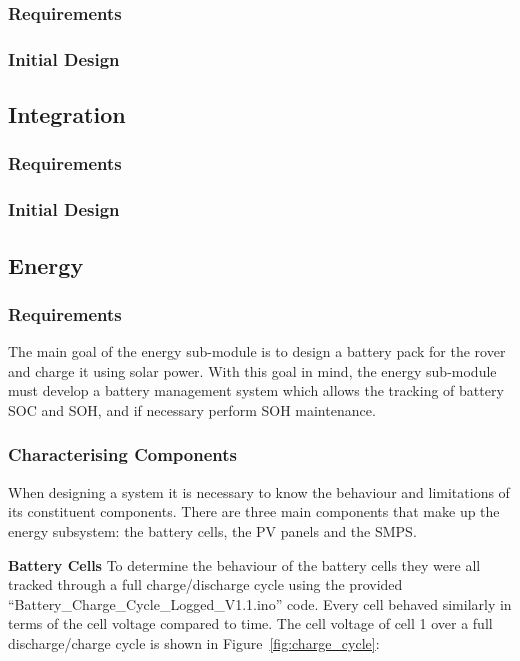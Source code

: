 \documentclass[a4paper]{article}
\begin{document}
\subsubsection{Requirements}
\subsubsection{Initial Design}


\subsection{Integration}
\subsubsection{Requirements}
\subsubsection{Initial Design}


\subsection{Energy}
\subsubsection{Requirements}

The main goal of the energy sub-module is to design a battery pack for the 
rover and charge it using solar power. With this goal in mind, the energy 
sub-module must develop a battery management system which allows the tracking 
of battery SOC and SOH, and if necessary perform SOH maintenance.         


\subsubsection{Characterising Components}
When designing a system it is necessary to know the behaviour and limitations of its
constituent components. There are three main components that make up the energy 
subsystem: the battery cells, the PV panels and the SMPS.

\textbf{Battery Cells}
\vspace{10pt} 
\newline
To determine the behaviour of the battery cells they were all tracked through a full charge/discharge 
cycle using the provided “Battery\_Charge\_Cycle\_Logged\_V1.1.ino” code\cite{chargeCode}. 
Every cell behaved similarly in terms of the cell voltage compared to time. 
The cell voltage of cell 1 over a full discharge/charge cycle is shown in Figure~\ref{fig:charge_cycle}:
\end{document}
